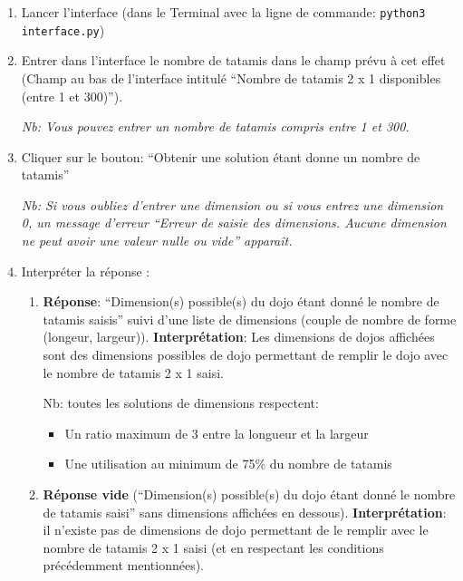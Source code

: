 \begin{enumerate}
    \item Lancer l’interface (dans le Terminal avec la ligne de commande: \texttt{python3 interface.py})
    \item Entrer dans l’interface le nombre de tatamis dans le champ prévu à cet effet (Champ au bas de l’interface intitulé 
    “Nombre de tatamis 2 x 1 disponibles (entre 1 et 300)”).

          \emph{Nb: Vous pouvez entrer un nombre de tatamis compris entre 1 et 300.}

    \item Cliquer sur le bouton: “Obtenir une solution étant donne un nombre de tatamis”

          \emph{Nb: Si vous oubliez d’entrer une dimension ou si vous entrez une dimension 0,
              un message d’erreur “Erreur de saisie des dimensions.
              Aucune dimension ne peut avoir une valeur nulle ou vide” apparaît.
          }

    \item Interpréter la réponse :
    \begin{enumerate}
        \item \textbf{Réponse}: “Dimension(s) possible(s) du dojo étant donné le nombre de tatamis saisis” suivi 
        d’une liste de dimensions (couple de nombre de forme (longeur, largeur)).
        \textbf{Interprétation}: Les dimensions de dojos affichées sont des dimensions possibles de dojo permettant 
        de remplir le dojo avec le nombre de tatamis 2 x 1 saisi.

        Nb: toutes les solutions de dimensions respectent:
        \begin{itemize}
            \item Un ratio maximum de 3 entre la longueur et la largeur
            \item Une utilisation au minimum de 75\% du nombre de tatamis
        \end{itemize}

        \item \textbf{Réponse vide} (“Dimension(s) possible(s) du dojo étant donné le nombre de tatamis saisi” 
        sans dimensions affichées en dessous). \textbf{Interprétation}: il n’existe pas de dimensions de dojo 
        permettant de le remplir avec le nombre de tatamis 2 x 1 saisi (et en respectant les conditions précédemment mentionnées).

    \end{enumerate}
         
\end{enumerate}

